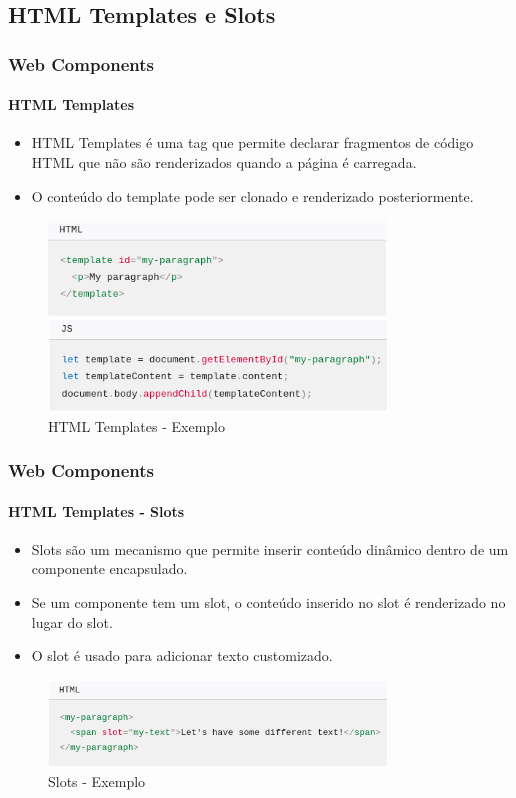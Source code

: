 \documentclass[
	9pt, %
	t, %
]{beamer}
\begin{document}
\subsection{HTML Templates e Slots}

\begin{frame}
	\frametitle{Web Components}
	\framesubtitle{HTML Templates}
	\begin{itemize}
		\item HTML Templates é uma tag que permite declarar fragmentos de código HTML que não são renderizados quando a página é carregada.
		\item O conteúdo do template pode ser clonado e renderizado posteriormente.
	\end{itemize}

	\begin{figure}
		\centering
		\includegraphics[width=0.8\textwidth]{html_templates.png}
		\caption{HTML Templates - Exemplo}
	\end{figure}

\end{frame}

\begin{frame}
	\frametitle{Web Components}
	\framesubtitle{HTML Templates - Slots}
	\begin{itemize}
		\item Slots são um mecanismo que permite inserir conteúdo dinâmico dentro de um componente encapsulado.
		\item Se um componente tem um slot, o conteúdo inserido no slot é renderizado no lugar do slot.
		\item O slot é usado para adicionar texto customizado.
	\end{itemize}

	\begin{figure}
		\centering
		\includegraphics[width=0.8\textwidth]{html_slots.png}
		\caption{Slots - Exemplo}
	\end{figure}

\end{frame}
\end{document}
